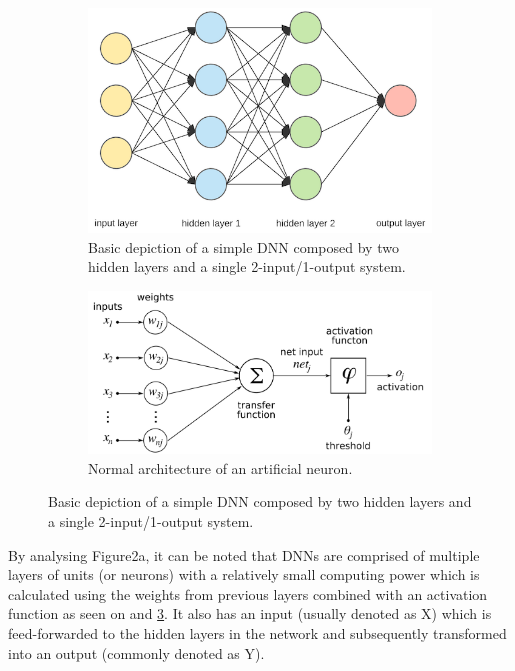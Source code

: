 \documentclass[12pt]{report}
\begin{document}
\begin{figure}[H]
\begin{subfigure}{0.65\linewidth}  
 \centering
  \includegraphics[width=\linewidth]{Figuras_tfg/Figure2_tfg}
  \caption{Basic depiction of a simple DNN composed by two hidden layers and a single 2-input/1-output system.}
  \label{fig:fig2a} 
\end{subfigure}

\begin{subfigure}{0.65\linewidth} 
  \centering
  \includegraphics[width=\linewidth]{Figuras_tfg/ArtificialNeuronModel_english.png}
  \caption{Normal architecture of an artificial neuron.}
  \label{fig:fig2b} 
\end{subfigure}
  \caption{Basic depiction of a simple DNN composed by two hidden layers and a single 2-input/1-output system.}
 \label{fig:fig2}
\end{figure}

By analysing Figure2a, it can be noted that DNNs are comprised of multiple layers of units (or neurons) with a relatively small computing power which is calculated using the weights from previous layers combined with an activation function as seen on and \ref{fig:fig2}. It also has an input (usually denoted as X) which is feed-forwarded to the hidden layers in the network and subsequently transformed into an output (commonly denoted as Y). 
\end{document}
